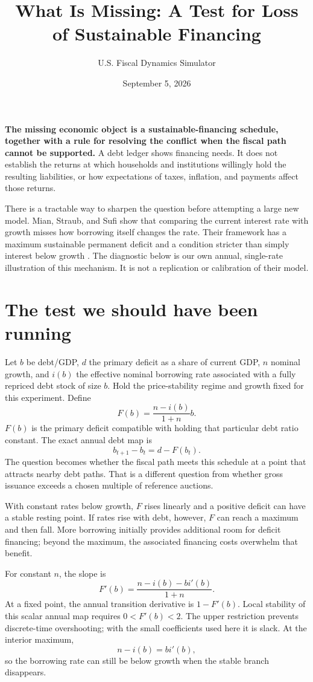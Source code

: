 \documentclass[11pt]{article}
\title{What Is Missing: A Test for Loss of Sustainable Financing}
\author{U.S. Fiscal Dynamics Simulator}
\date{September 5, 2026}
\begin{document}
\maketitle

\textbf{The missing economic object is a sustainable-financing schedule, together with
a rule for resolving the conflict when the fiscal path cannot be supported.} A debt ledger
shows financing needs. It does not establish the returns at which households and
institutions willingly hold the resulting liabilities, or how expectations of taxes,
inflation, and payments affect those returns.

There is a tractable way to sharpen the question before attempting a large new model.
Mian, Straub, and Sufi show that comparing the current interest rate with growth misses
how borrowing itself changes the rate. Their framework has a maximum sustainable
permanent deficit and a condition stricter than simply interest below growth
\cite{goldilocks}. The diagnostic below is our own annual, single-rate illustration of
this mechanism. It is not a replication or calibration of their model.

\section{The test we should have been running}

Let $b$ be debt/GDP, $d$ the primary deficit as a share of current GDP, $n$ nominal growth,
and $i(b)$ the effective nominal borrowing rate associated with a fully repriced debt stock
of size $b$. Hold the price-stability regime and growth fixed for this experiment. Define
\[
F(b)=\frac{n-i(b)}{1+n}b.
\]
$F(b)$ is the primary deficit compatible with holding that particular debt ratio constant.
The exact annual debt map is
\[
b_{t+1}-b_t=d-F(b_t).
\]
The question becomes whether the fiscal path meets this schedule at a point that attracts
nearby debt paths. That is a different question from whether gross issuance exceeds a
chosen multiple of reference auctions.

With constant rates below growth, $F$ rises linearly and a positive deficit can have a
stable resting point. If rates rise with debt, however, $F$ can reach a maximum and then
fall. More borrowing initially provides additional room for deficit financing; beyond
the maximum, the associated financing costs overwhelm that benefit.

For constant $n$, the slope is
\[
F'(b)=\frac{n-i(b)-b i'(b)}{1+n}.
\]
At a fixed point, the annual transition derivative is $1-F'(b)$. Local stability of this
scalar annual map requires $0<F'(b)<2$. The upper restriction prevents discrete-time
overshooting; with the small coefficients used here it is slack. At the interior maximum,
\[
n-i(b)=b i'(b),
\]
so the borrowing rate can still be below growth when the stable branch disappears.
\end{document}
